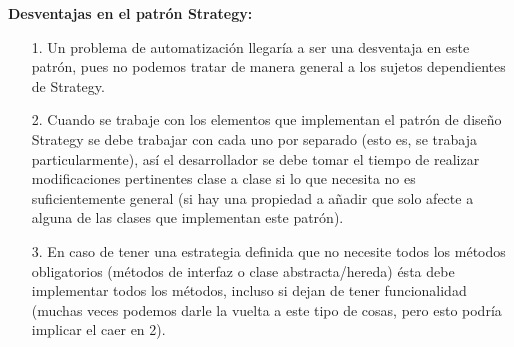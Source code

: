 \documentclass{article}
\begin{document}
\textbf{Desventajas en el patrón Strategy:}
\begin{itemize}
\item[1.] Un problema de automatización llegaría a ser una desventaja en este patrón, pues no podemos tratar de manera general a los sujetos dependientes de Strategy.
\item[2.] Cuando se trabaje con los elementos que implementan el patrón de diseño Strategy se debe trabajar con cada uno por separado (esto es, se trabaja particularmente), así el desarrollador se debe tomar el tiempo de realizar modificaciones pertinentes clase a clase si lo que necesita no es suficientemente general (si hay una propiedad a añadir que solo afecte a alguna de las clases que implementan este patrón).
\item[3.] En caso de tener una estrategia definida que no necesite todos los métodos obligatorios (métodos de interfaz o clase abstracta/hereda) ésta debe implementar todos los métodos, incluso si dejan de tener funcionalidad (muchas veces podemos darle la vuelta a este tipo de cosas, pero esto podría implicar el caer en 2).
\end{itemize}
\end{document}

